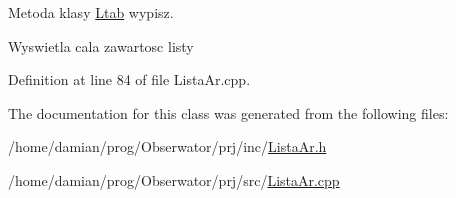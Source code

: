 Metoda klasy \hyperlink{class_ltab}{Ltab} wypisz. 

Wyswietla cala zawartosc listy 

Definition at line 84 of file Lista\-Ar.\-cpp.



The documentation for this class was generated from the following files\-:\begin{DoxyCompactItemize}
\item 
/home/damian/prog/\-Obserwator/prj/inc/\hyperlink{_lista_ar_8h}{Lista\-Ar.\-h}\item 
/home/damian/prog/\-Obserwator/prj/src/\hyperlink{_lista_ar_8cpp}{Lista\-Ar.\-cpp}\end{DoxyCompactItemize}
